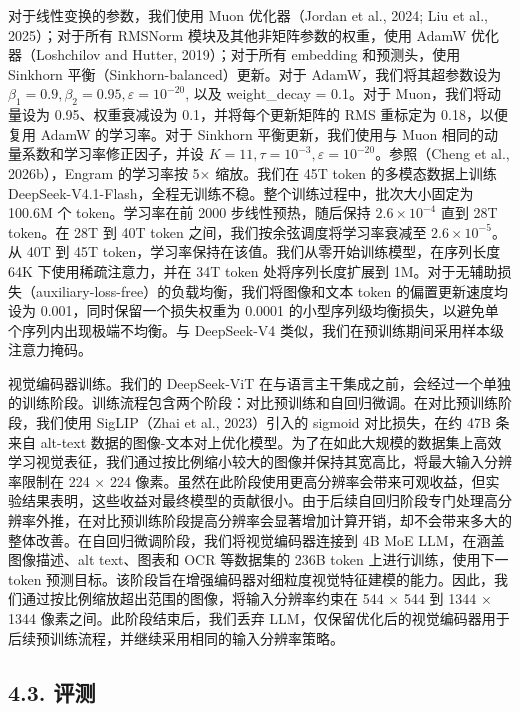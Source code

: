 对于线性变换的参数，我们使用 Muon 优化器（Jordan et al., 2024; Liu et al., 2025）；对于所有 RMSNorm 模块及其他非矩阵参数的权重，使用 AdamW 优化器（Loshchilov and Hutter, 2019）；对于所有 embedding 和预测头，使用 Sinkhorn 平衡（Sinkhorn-balanced）更新。对于 AdamW，我们将其超参数设为 \(\beta _ { 1 } = 0 . 9 , \beta _ { 2 } = 0 . 9 5 , \varepsilon = 1 0 ^ { - 2 0 }\), 以及 weight\_decay = 0.1。对于 Muon，我们将动量设为 0.95、权重衰减设为 0.1，并将每个更新矩阵的 RMS 重标定为 0.18，以便复用 AdamW 的学习率。对于 Sinkhorn 平衡更新，我们使用与 Muon 相同的动量系数和学习率修正因子，并设 \(K = 1 1 , \tau = 1 0 ^ { - 3 } , \varepsilon = 1 0 ^ { - 2 0 }\)。参照（Cheng et al., 2026b），Engram 的学习率按 5$\times$ 缩放。我们在 45T token 的多模态数据上训练 DeepSeek-V4.1-Flash，全程无训练不稳。整个训练过程中，批次大小固定为 100.6M 个 token。学习率在前 2000 步线性预热，随后保持 \(2 . 6 \times 1 0 ^ { - 4 }\) 直到 28T token。在 28T 到 40T token 之间，我们按余弦调度将学习率衰减至 \(2 . 6 \times 1 0 ^ { - 5 }\)。从 40T 到 45T token，学习率保持在该值。我们从零开始训练模型，在序列长度 64K 下使用稀疏注意力，并在 34T token 处将序列长度扩展到 1M。对于无辅助损失（auxiliary-loss-free）的负载均衡，我们将图像和文本 token 的偏置更新速度均设为 0.001，同时保留一个损失权重为 0.0001 的小型序列级均衡损失，以避免单个序列内出现极端不均衡。与 DeepSeek-V4 类似，我们在预训练期间采用样本级注意力掩码。

视觉编码器训练。我们的 DeepSeek-ViT 在与语言主干集成之前，会经过一个单独的训练阶段。训练流程包含两个阶段：对比预训练和自回归微调。在对比预训练阶段，我们使用 SigLIP（Zhai et al., 2023）引入的 sigmoid 对比损失，在约 47B 条来自 alt-text 数据的图像-文本对上优化模型。为了在如此大规模的数据集上高效学习视觉表征，我们通过按比例缩小较大的图像并保持其宽高比，将最大输入分辨率限制在 224 $\times$ 224 像素。虽然在此阶段使用更高分辨率会带来可观收益，但实验结果表明，这些收益对最终模型的贡献很小。由于后续自回归阶段专门处理高分辨率外推，在对比预训练阶段提高分辨率会显著增加计算开销，却不会带来多大的整体改善。在自回归微调阶段，我们将视觉编码器连接到 4B MoE LLM，在涵盖图像描述、alt text、图表和 OCR 等数据集的 236B token 上进行训练，使用下一 token 预测目标。该阶段旨在增强编码器对细粒度视觉特征建模的能力。因此，我们通过按比例缩放超出范围的图像，将输入分辨率约束在 544 $\times$ 544 到 1344 $\times$ 1344 像素之间。此阶段结束后，我们丢弃 LLM，仅保留优化后的视觉编码器用于后续预训练流程，并继续采用相同的输入分辨率策略。



\subsection{4.3. 评测}\label{evaluations}

